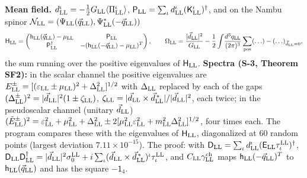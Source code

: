\documentclass[
  10pt,
]{article}
\begin{document}
\textbf{Mean field.}
\(d^\iota_{\rm LL}=-\tfrac12G_{\rm LL}\langle\Pi^\iota_{\rm LL}\rangle\),
\(\mathsf P_{\rm LL}=\sum_\iota d^\iota_{\rm LL}(\mathsf K^\iota_{\rm LL})^\dagger\),
and on the Nambu spinor
\(\mathcal N_{\rm LL}=(\Psi_{\rm LL}(\vec q_{\rm LL}),\Psi^*_{\rm LL}(-\vec q_{\rm LL}))\)
\[\mathsf H_{\rm LL}=\begin{pmatrix}\mathsf h_{\rm LL}(\vec q_{\rm LL})-\mu_{\rm LL}&\mathsf P_{\rm LL}\\\mathsf P_{\rm LL}^\dagger&-(\mathsf h_{\rm LL}(-\vec q_{\rm LL})-\mu_{\rm LL})^T\end{pmatrix},\qquad
\Omega_{\rm LL}=\frac{\lvert\vec d_{\rm LL}\rvert^2}{G_{\rm LL}}-\frac12\int\!\frac{d^3q_{\rm LL}}{(2\pi)^3}\sum_{\rm pos}(\ldots)-(\ldots)_{\vec d_{\rm LL}=0},\]
the sum running over the positive eigenvalues of \(\mathsf H_{\rm LL}\).
\textbf{Spectra (S-3, Theorem SF2):} in the scalar channel the positive
eigenvalues are
\(E^\pm_{\rm LL}=[(\varepsilon_{\rm LL}\pm\mu_{\rm LL})^2+\Delta_{\rm LL}^2]^{1/2}\)
with \(\Delta_{\rm LL}\) replaced by each of the gaps
\((\Delta^\pm_{\rm LL})^2=\lvert\vec d_{\rm LL}\rvert^2(1\pm\zeta_{\rm LL})\),
\(\zeta_{\rm LL}=\lvert\vec d_{\rm LL}\times\vec d^{\,*}_{\rm LL}\rvert/\lvert\vec d_{\rm LL}\rvert^2\),
each twice; in the pseudoscalar channel (unitary \(\vec d_{\rm LL}\))
\((\tilde E^\pm_{\rm LL})^2=\varepsilon_{\rm LL}^2+\mu_{\rm LL}^2+\Delta_{\rm LL}^2\pm2[\mu_{\rm LL}^2\varepsilon_{\rm LL}^2+m_{\rm LL}^2\Delta_{\rm LL}^2]^{1/2}\),
four times each. The program compares these with the eigenvalues of
\(\mathsf H_{\rm LL}\), diagonalized at 60 random points (largest
deviation \(7.11\times10^{-15}\)). The proof: with
\(\mathsf D_{\rm LL}=\sum_\iota d^\iota_{\rm LL}(\mathsf E_{\rm LL}\tau^{\rm LL}_\iota)^\dagger\),
\(\mathsf D_{\rm LL}\mathsf D_{\rm LL}^\dagger=\lvert\vec d_{\rm LL}\rvert^2\sigma^{\rm LL}_0+i\sum_\iota(\vec d_{\rm LL}\times\vec d^{\,*}_{\rm LL})^\iota\tau^{\rm LL}_\iota\),
and \(C_{\rm LL}\gamma^{\rm ch}_{\rm LL}\) maps
\(\mathsf h_{\rm LL}(-\vec q_{\rm LL})^T\) to
\(\mathsf h_{\rm LL}(\vec q_{\rm LL})\) and has the square
\(-\mathsf 1_4\).
\end{document}
